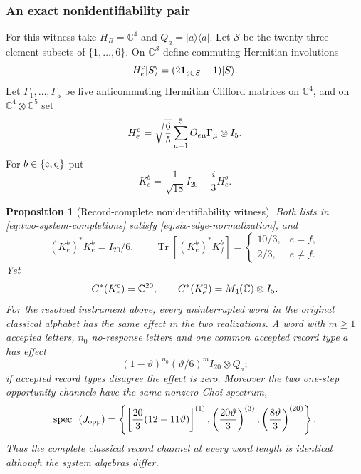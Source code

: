 \documentclass[11pt]{article}
\numberwithin{equation}{section}
\newtheorem{proposition}[theorem]{Proposition}
\theoremstyle{definition}
\theoremstyle{remark}
\newcommand{\C}{\mathbb C}
\newcommand{\Tr}{\operatorname{Tr}}
\newcommand{\spec}{\operatorname{spec}}
\begin{document}
\subsubsection{An exact nonidentifiability pair}

For this witness take $H_R=\C^4$ and $Q_a=|a\rangle\langle a|$.
Let $\mathscr S$ be the twenty three-element subsets of
$\{1,\ldots,6\}$.  On $\C^{\mathscr S}$ define commuting Hermitian
involutions
\[
 H_e^{\rm c}|S\rangle=(2\mathbf1_{e\in S}-1)|S\rangle.
\]
Let $\Gamma_1,\ldots,\Gamma_5$ be five anticommuting Hermitian Clifford
matrices on $\C^4$, and on $\C^4\otimes\C^5$ set
\[
 H_e^{\rm q}=\sqrt{\frac65}\sum_{\mu=1}^5O_{e\mu}\Gamma_\mu\otimes I_5.
\]
For $b\in\{{\rm c},{\rm q}\}$ put
\begin{equation}
 K_e^b=\frac1{\sqrt{18}}I_{20}+\frac{i}{3}H_e^b.
 \label{eq:two-system-completions}
\end{equation}

\begin{proposition}[Record-complete nonidentifiability witness]
\label{prop:record-witness}
Both lists in \eqref{eq:two-system-completions} satisfy
\eqref{eq:six-edge-normalization}, and
\begin{equation}
 (K_e^b)^*K_e^b=I_{20}/6,
 \qquad
 \Tr[(K_e^b)^*K_f^b]
 =\begin{cases}10/3,&e=f,\\2/3,&e\ne f.\end{cases}
 \label{eq:matching-record-data}
\end{equation}
Yet
\begin{equation}
 C^*(K_e^{\rm c})=\C^{20},
 \qquad
 C^*(K_e^{\rm q})=M_4(\C)\otimes I_5.
 \label{eq:inequivalent-system-algebras}
\end{equation}
For the resolved instrument above, every uninterrupted word in the original
classical alphabet has the same effect in the two realizations.  A word with
$m\ge1$ accepted letters, $n_0$ no-response letters and one common accepted
record type $a$ has effect
\begin{equation}
 (1-\vartheta)^{n_0}(\vartheta/6)^m I_{20}\otimes Q_a;
 \label{eq:record-word-effect}
\end{equation}
if accepted record types disagree the effect is zero.  Moreover the two one-step opportunity channels have the same nonzero Choi
spectrum,
\begin{equation}
 \spec_+(J_{\rm opp})=
 \left\{
 \left[\frac{20}{3}(12-11\vartheta)\right]^{(1)},
 \left(\frac{20\vartheta}{3}\right)^{(3)},
 \left(\frac{8\vartheta}{3}\right)^{(20)}
 \right\}.
 \label{eq:matching-Choi-spectrum}
\end{equation}
Thus the complete classical record channel at every word length is identical
although the system algebras differ.
\end{proposition}
\end{document}
